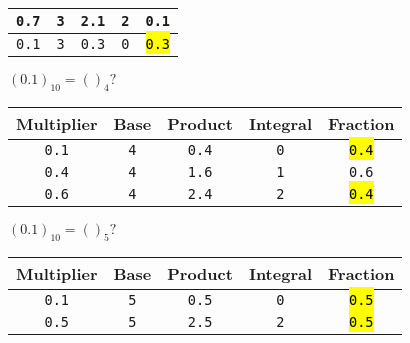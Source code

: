 \documentclass[12pt]{article}
\begin{document}
\begin{minipage}[t]{0.5\textwidth}
\begin{center}
\begin{tabular}{|c|c|c|c|c|}
			\texttt{0.7}                         & \texttt{3} & \texttt{2.1} & \texttt{2} & \texttt{0.1}      \\\hline
			\texttt{0.1}                         & \texttt{3} & \texttt{0.3} & \texttt{0} & \hl{\texttt{0.3}} \\\hline
		\end{tabular}
	\end{center}
	$(0.1)_{10} = ()_4?$
	\begin{center}
		\begin{tabular}{|c|c|c|c|c|}
			\hline \cellcolor{gray!25}Multiplier &
			\cellcolor{gray!25}Base              &
			\cellcolor{gray!25}Product           &
			\cellcolor{gray!25}Integral          &
			\cellcolor{gray!25}Fraction                                                                       \\
			\hline\hline
			\texttt{0.1}                         & \texttt{4} & \texttt{0.4} & \texttt{0} & \hl{\texttt{0.4}} \\\hline
			\texttt{0.4}                         & \texttt{4} & \texttt{1.6} & \texttt{1} & \texttt{0.6}      \\\hline
			\texttt{0.6}                         & \texttt{4} & \texttt{2.4} & \texttt{2} & \hl{\texttt{0.4}} \\\hline
		\end{tabular}
	\end{center}
	$(0.1)_{10} = ()_5?$
	\begin{center}
		\begin{tabular}{|c|c|c|c|c|}
			\hline \cellcolor{gray!25}Multiplier &
			\cellcolor{gray!25}Base              &
			\cellcolor{gray!25}Product           &
			\cellcolor{gray!25}Integral          &
			\cellcolor{gray!25}Fraction                                                                       \\
			\hline\hline
			\texttt{0.1}                         & \texttt{5} & \texttt{0.5} & \texttt{0} & \hl{\texttt{0.5}} \\\hline
			\texttt{0.5}                         & \texttt{5} & \texttt{2.5} & \texttt{2} & \hl{\texttt{0.5}} \\\hline
		\end{tabular}
	\end{center}
\end{minipage}
\end{document}

